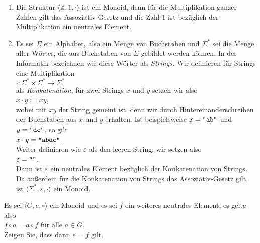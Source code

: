 \examples
\begin{enumerate}
\item Die Struktur $\langle \mathbb{Z}, 1, \cdot \rangle$ ist ein Monoid, denn für die Multiplikation
      ganzer Zahlen gilt das Assoziativ-Gesetz und die Zahl $1$ ist bezüglich der Multiplikation ein
      neutrales Element.
\item Es sei $\Sigma$ ein Alphabet, also ein Menge von Buchstaben und $\Sigma^*$ sei die Menge aller
      Wörter, die aus Buchstaben von $\Sigma$ gebildet werden können.  In der Informatik bezeichnen
      wir diese Wörter als \emph{Strings}.  Wir definieren für Strings eine Multiplikation
      \\[0.2cm]
      \hspace*{1.3cm}
      $\cdot: \Sigma^* \times \Sigma^* \rightarrow \Sigma^*$
      \\[0.2cm]
      als \emph{Konkatenation}, für zwei Strings $x$ und $y$ setzen wir also
      \\[0.2cm]
      \hspace*{1.3cm}
      $x \cdot y := xy$,
      \\[0.2cm]
      wobei mit $xy$ der String gemeint ist, denn wir durch Hintereinanderschreiben der Buchstaben
      aus $x$ und $y$ erhalten.  Ist beispielsweise $x = \texttt{\symbol{34}ab\symbol{34}}$ und $y = \texttt{\symbol{34}dc\symbol{34}}$,
      so gilt 
      \\[0.2cm]
      \hspace*{1.3cm}
      $x \cdot y = \texttt{\symbol{34}abdc\symbol{34}}$.
      \\[0.2cm]
      Weiter definieren wie $\varepsilon$ als den leeren String, wir setzen also
      \\[0.2cm]
      \hspace*{1.3cm}
      $\varepsilon = \texttt{\symbol{34}\symbol{34}}$.
      \\[0.2cm]
      Dann ist $\varepsilon$ ein neutrales Element bezüglich der Konkatenation von Strings.  Da
      außerdem für die Konkatenation von Strings das Assoziativ-Gesetz gilt, ist $\langle \Sigma^*, \varepsilon, \cdot \rangle$ ein
      Monoid. 
      \eox
\end{enumerate}

\exercise
Es sei $\langle G, e, \circ \rangle$ ein Monoid und es sei $f$ ein weiteres neutrales Element, es gelte also
\\[0.2cm]
\hspace*{1.3cm}
$f \circ a = a \circ f$ \quad für alle $a \in G$.
\\[0.2cm]
Zeigen Sie, dass dann $e = f$ gilt.  
\eox



